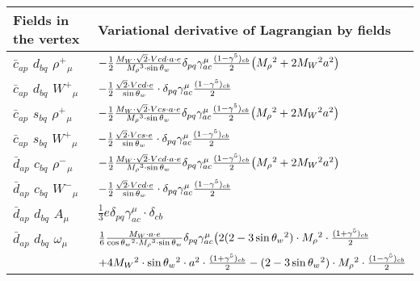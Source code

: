 \begin{center}
\begin{tabular}{|l|l|} \hline
Fields in the vertex & Variational derivative of Lagrangian by fields \\ \hline
$\bar{c}{}_{a p }$ \phantom{-} $d{}_{b q }$ \phantom{-} $\rho^+{}_{\mu }$ \phantom{-}  &
	$-\frac{1}{2}\frac{ M_W \cdot\sqrt{2} \cdot Vcd \cdot a \cdot e}{ M_\rho{}^3  \cdot \sin{\theta}_w}\delta_{p q} \gamma_{a c}^\mu {(1-\gamma^5)_{c b}\over 2} \big( M_\rho{}^2 +2 M_W{}^2  a{}^2 \big)$\\[2mm]
$\bar{c}{}_{a p }$ \phantom{-} $d{}_{b q }$ \phantom{-} $W^+{}_{\mu }$ \phantom{-}  &
	$-\frac{1}{2}\frac{\sqrt{2} \cdot Vcd \cdot e}{ \sin{\theta}_w}\cdot \delta_{p q} \gamma_{a c}^\mu {(1-\gamma^5)_{c b}\over 2} $\\[2mm]
$\bar{c}{}_{a p }$ \phantom{-} $s{}_{b q }$ \phantom{-} $\rho^+{}_{\mu }$ \phantom{-}  &
	$-\frac{1}{2}\frac{ M_W \cdot\sqrt{2} \cdot Vcs \cdot a \cdot e}{ M_\rho{}^3  \cdot \sin{\theta}_w}\delta_{p q} \gamma_{a c}^\mu {(1-\gamma^5)_{c b}\over 2} \big( M_\rho{}^2 +2 M_W{}^2  a{}^2 \big)$\\[2mm]
$\bar{c}{}_{a p }$ \phantom{-} $s{}_{b q }$ \phantom{-} $W^+{}_{\mu }$ \phantom{-}  &
	$-\frac{1}{2}\frac{\sqrt{2} \cdot Vcs \cdot e}{ \sin{\theta}_w}\cdot \delta_{p q} \gamma_{a c}^\mu {(1-\gamma^5)_{c b}\over 2} $\\[2mm]
$\bar{d}{}_{a p }$ \phantom{-} $c{}_{b q }$ \phantom{-} $\rho^-{}_{\mu }$ \phantom{-}  &
	$-\frac{1}{2}\frac{ M_W \cdot\sqrt{2} \cdot Vcd \cdot a \cdot e}{ M_\rho{}^3  \cdot \sin{\theta}_w}\delta_{p q} \gamma_{a c}^\mu {(1-\gamma^5)_{c b}\over 2} \big( M_\rho{}^2 +2 M_W{}^2  a{}^2 \big)$\\[2mm]
$\bar{d}{}_{a p }$ \phantom{-} $c{}_{b q }$ \phantom{-} $W^-{}_{\mu }$ \phantom{-}  &
	$-\frac{1}{2}\frac{\sqrt{2} \cdot Vcd \cdot e}{ \sin{\theta}_w}\cdot \delta_{p q} \gamma_{a c}^\mu {(1-\gamma^5)_{c b}\over 2} $\\[2mm]
$\bar{d}{}_{a p }$ \phantom{-} $d{}_{b q }$ \phantom{-} ${A}_{\mu }$ \phantom{-}  &
	$\frac{1}{3} e\delta_{p q} \gamma_{a c}^\mu \cdot \delta_{c b} $\\[2mm]
$\bar{d}{}_{a p }$ \phantom{-} $d{}_{b q }$ \phantom{-} $\omega{}_{\mu }$ \phantom{-}  &
	$\frac{1}{6}\frac{ M_W \cdot a \cdot e}{ \cos{\theta}_w{}^2  \cdot M_\rho{}^3  \cdot \sin{\theta}_w}\delta_{p q} \gamma_{a c}^\mu \big(2 (2-3 \sin{\theta}_w {}^2)\cdot  M_\rho{}^2 \cdot {(1+\gamma^5)_{c b}\over 2} $ \\[2mm]
  & $+4 M_W{}^2 \cdot  \sin{\theta}_w{}^2 \cdot  a{}^2 \cdot {(1+\gamma^5)_{c b}\over 2} - (2-3 \sin{\theta}_w {}^2)\cdot  M_\rho{}^2 \cdot {(1-\gamma^5)_{c b}\over 2} $ \\[2mm]

\end{tabular}
\end{center}

